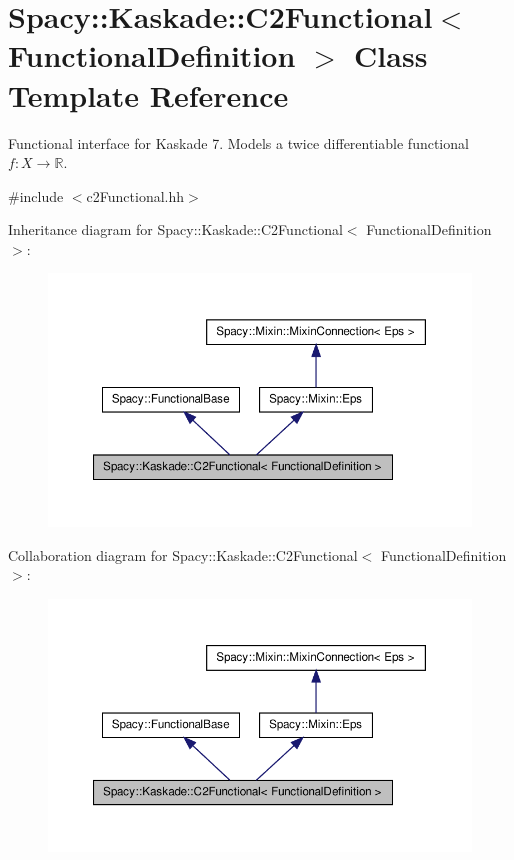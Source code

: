 \hypertarget{classSpacy_1_1Kaskade_1_1C2Functional}{\section{\-Spacy\-:\-:\-Kaskade\-:\-:\-C2\-Functional$<$ \-Functional\-Definition $>$ \-Class \-Template \-Reference}
\label{classSpacy_1_1Kaskade_1_1C2Functional}
}


\-Functional interface for \-Kaskade 7. \-Models a twice differentiable functional $f:X\rightarrow \mathbb{R}$.  




{\ttfamily \#include $<$c2\-Functional.\-hh$>$}



\-Inheritance diagram for \-Spacy\-:\-:\-Kaskade\-:\-:\-C2\-Functional$<$ \-Functional\-Definition $>$\-:
\nopagebreak
\begin{figure}[H]
\begin{center}
\leavevmode
\includegraphics[width=350pt]{classSpacy_1_1Kaskade_1_1C2Functional__inherit__graph}
\end{center}
\end{figure}


\-Collaboration diagram for \-Spacy\-:\-:\-Kaskade\-:\-:\-C2\-Functional$<$ \-Functional\-Definition $>$\-:
\nopagebreak
\begin{figure}[H]
\begin{center}
\leavevmode
\includegraphics[width=350pt]{classSpacy_1_1Kaskade_1_1C2Functional__coll__graph}
\end{center}
\end{figure}
